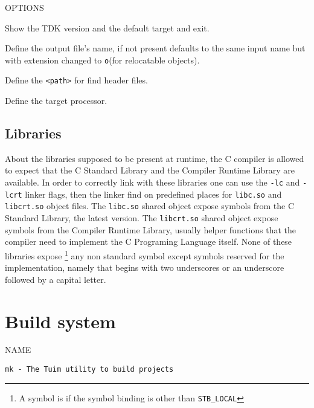 \documentclass[
   article,                      %
   10pt,                         %
   openright,                    %
   oneside,                      %
   a4paper,                      %
   sumario = tradicional,        %
   english,                      %
   xcolor=table                  %
]{abntex2}
\begin{document}
\noindent OPTIONS

\begin{description}[style=multiline,leftmargin=5cm]
   \item[\texttt{{-}{-}version}]
   Show the TDK version and the default target and exit.
   \item[\texttt{-o <name>}]
   Define the output file's name,
   if not present defaults to the same input name but with
   extension changed to \texttt{o}(for relocatable objects).
   \item[\texttt{-I <path>}]
   Define the \texttt{<path>} for find header files.
   \item[\texttt{{-}{-}target <target>}]
   Define the target processor.
\end{description}

\subsection{Libraries}
\label{sec:cc:library}

About the libraries supposed to be present at runtime,
the C compiler is allowed to expect that the C Standard Library and
the Compiler Runtime Library are available.
In order to correctly link with these libraries one can use the
\texttt{-lc} and \texttt{-lcrt} linker flags,
then the linker find on predefined places for
\texttt{libc.so} and \texttt{libcrt.so} object files.
The \texttt{libc.so} shared object
expose symbols from the C Standard Library, the latest version\cite{ISO9899}.
The \texttt{libcrt.so} shared object
expose symbols from the Compiler Runtime Library,
usually helper functions that the compiler need to implement
the C Programing Language itself.
None of these libraries expose%
\footnote{A symbol is 
if the symbol binding is other than \texttt{STB\_LOCAL}} any non standard symbol
except symbols reserved for the implementation, namely that begins with
two underscores or an underscore followed by a capital letter.

\newpage
\section{Build system}

\noindent NAME

\begin{lstlisting}[style=bash]
mk - The Tuim utility to build projects
\end{lstlisting}
\end{document}
